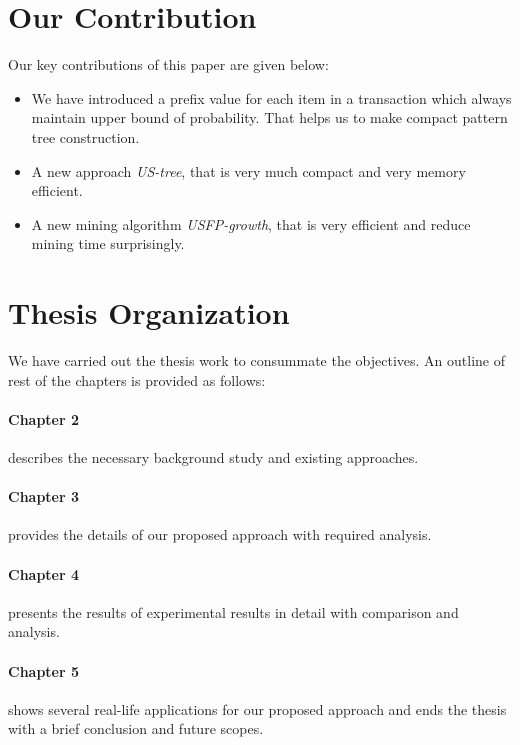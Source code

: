 \section{Our Contribution}
Our key contributions of this paper are given below:
\begin{itemize}
\item We have introduced a prefix value for each item in a transaction which always maintain upper bound of probability. That helps us to make compact pattern tree construction.
\item A new approach \emph{US-tree}, that is very much compact and very memory efficient.
\item A new mining algorithm \emph{USFP-growth}, that is very efficient and reduce mining time surprisingly.
\end{itemize}


\section{Thesis Organization}
	We have carried out the thesis work to consummate the objectives. An outline of rest of the chapters is provided as follows:
	\paragraph{Chapter 2} describes the necessary background study and existing approaches.
	\paragraph{Chapter 3} provides the details of our proposed approach with required analysis.
	\paragraph{Chapter 4} presents the results of experimental results in detail with comparison and analysis.
	\paragraph{Chapter 5} shows several real-life applications for our proposed approach and ends the thesis with a brief conclusion and future scopes.
%
